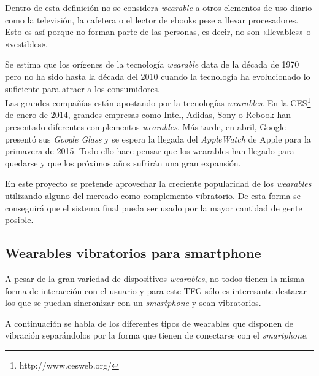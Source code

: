 Dentro de esta definición no se considera \emph{wearable} a otros elementos de uso diario como la
televisión, la cafetera o el lector de ebooks pese a llevar procesadores. Esto es así porque no
forman parte de las personas, es decir, no son «llevables» o «vestibles».

Se estima que los orígenes de la tecnología \emph{wearable} data de la década de 1970 pero no ha
sido hasta la década del 2010 cuando la tecnología ha evolucionado lo suficiente para atraer a los
consumidores.\\

Las grandes compañías están apostando por la tecnologías \emph{wearables}.  En la
\acf{CES}\footnote{http://www.cesweb.org/} de enero de 2014, grandes empresas como Intel,
Adidas, Sony o Rebook han presentado diferentes complementos \emph{wearables}. Más tarde, en abril,
Google presentó sus \emph{Google Glass} y se espera la llegada del \emph{AppleWatch} de Apple para
la primavera de 2015. Todo ello hace pensar que los wearables han llegado para quedarse y que los
próximos años sufrirán una gran expansión.

En este proyecto se pretende aprovechar la creciente popularidad de los \emph{wearables} utilizando
alguno del mercado como complemento vibratorio. De esta forma se conseguirá que el sistema
final pueda ser usado por la mayor cantidad de gente posible.

\subsection{Wearables vibratorios para smartphone}
\label{sec:wearables}

A pesar de la gran variedad de dispositivos \emph{wearables}, no todos tienen la misma forma de
interacción con el usuario y para este \acs{TFG} sólo es interesante destacar los que se puedan
sincronizar con un \emph{smartphone} y sean vibratorios.

A continuación se habla de los diferentes tipos de wearables que disponen de vibración separándolos
por la forma que tienen de conectarse con el \emph{smartphone}.

